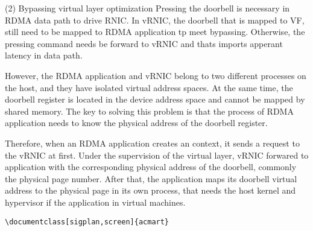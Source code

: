 \documentclass[sigplan,screen]{acmart}
\begin{document}
(2) Bypassing virtual layer optimization
Pressing the doorbell is necessary in RDMA data path to drive RNIC. In vRNIC, the doorbell that is mapped to VF, still need to be mapped to RDMA application tp meet bypassing. Otherwise, the pressing command needs be forward to vRNIC and thats imports apperant latency in data path.

However, the RDMA application and vRNIC belong to two different processes on the host, and they have isolated virtual address spaces. At the same time, the doorbell register is located in the device address space and cannot be mapped by shared memory. The key to solving this problem is that the process of RDMA application needs to know the physical address of the doorbell register.

Therefore, when an RDMA application creates an context, it sends a request to the vRNIC at first. Under the supervision of the virtual layer, vRNIC forwared to application with the corresponding physical address of the doorbell, commonly the physical page number. After that, the application maps its doorbell virtual address to the physical page in its own process, that needs the host kernel and hypervisor if the application in virtual machines.
\begin{verbatim}
\documentclass[sigplan,screen]{acmart}
\end{verbatim}
\end{document}
